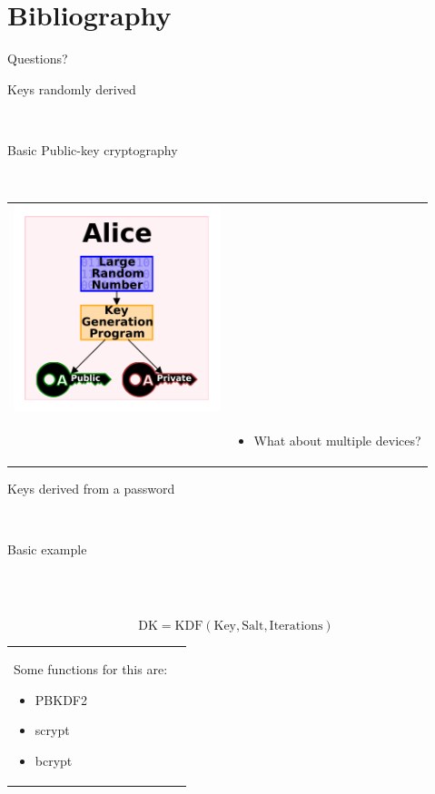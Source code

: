 \documentclass[12pt]{beamer}
\renewcommand{\frametitle}[1]{\vspace{0.2cm}\begin{huge}#1\end{huge}\\}
\renewcommand{\framesubtitle}[1]{\vspace{0.4cm} \hspace{0.4cm}\begin{large}#1\end{large}\\}
\begin{document}
  \section{Bibliography}
\frame
{
	\vspace{2cm}
	\begin{center}
		\Large{Questions?}
	\end{center}
}

  \begin{frame}
  \frametitle{Keys randomly derived}
  \framesubtitle{Basic Public-key cryptography}
  \begin{table}
  \begin{tabular}{p{7cm}p{3cm}}
  \includegraphics[width=6cm]{img/Public-key-crypto}\\
  &
  \begin{itemize}
    \item What about multiple devices?
  \end{itemize}
  \end{tabular}
  \end{table}
  \end{frame}

  \begin{frame}
  \frametitle{Keys derived from a password}
  \framesubtitle{Basic example}
  \framesubtitle{}
  $$ \text{DK}=\text{KDF}(\text{Key}, \text{Salt}, \text{Iterations}) $$
  \begin{table}
  \begin{tabular}{p{7cm}p{3cm}}
  Some functions for this are:
  \begin{itemize}
    \item PBKDF2
    \item scrypt
    \item bcrypt
  \end{itemize}
  &
  \vspace{1.5cm}
  \end{tabular}
  \end{table}
  \end{frame}
\end{document}
